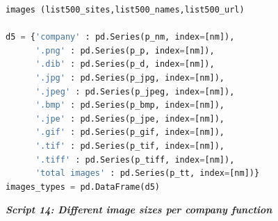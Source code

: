 \documentclass{book}
\begin{document}
\begin{lstlisting}[language=Python]
images (list500_sites,list500_names,list500_url)

d5 = {'company' : pd.Series(p_nm, index=[nm]),
      '.png' : pd.Series(p_p, index=[nm]),
      '.dib' : pd.Series(p_d, index=[nm]),
      '.jpg' : pd.Series(p_jpg, index=[nm]),
      '.jpeg' : pd.Series(p_jpeg, index=[nm]),
      '.bmp' : pd.Series(p_bmp, index=[nm]),
      '.jpe' : pd.Series(p_jpe, index=[nm]),
      '.gif' : pd.Series(p_gif, index=[nm]),
      '.tif' : pd.Series(p_tif, index=[nm]),
      '.tiff' : pd.Series(p_tiff, index=[nm]), 
      'total images' : pd.Series(p_tt, index=[nm])}
images_types = pd.DataFrame(d5)    
\end{lstlisting}

\begin{center}
\textit{\textbf{Script 14: Different image sizes per company function}}\label{p14}
\end{center}
\end{document}

